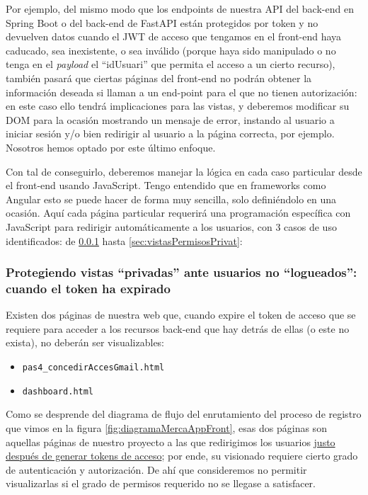 \documentclass[a4paper,12pt]{report}
\begin{document}
	Por ejemplo, del mismo modo que los endpoints de nuestra API del back-end en Spring Boot o del back-end de FastAPI están protegidos por token y no devuelven datos cuando el JWT de acceso que tengamos en el front-end haya caducado, sea inexistente, o sea inválido (porque haya sido manipulado o no tenga en el \textit{payload} el ``idUsuari'' que permita el acceso a un cierto recurso), también pasará que ciertas páginas del front-end no podrán obtener la información deseada si llaman a un end-point para el que no tienen autorización: en este caso ello tendrá implicaciones para las vistas, y deberemos modificar su DOM para la ocasión mostrando un mensaje de error, instando al usuario a iniciar sesión y/o bien redirigir al usuario a la página correcta, por ejemplo. Nosotros hemos optado por este último enfoque.
	
	Con tal de conseguirlo, deberemos manejar la lógica en cada caso particular desde el front-end usando JavaScript. Tengo entendido que en frameworks como Angular esto se puede hacer de forma muy sencilla, solo definiéndolo en una ocasión. Aquí cada página particular requerirá una programación específica con JavaScript para redirigir automáticamente a los usuarios, con 3 casos de uso identificados: de \ref{sec:privatsNologuejats} hasta \ref{sec:vistasPermisosPrivat}:
	
	\subsubsection{Protegiendo vistas ``privadas'' ante usuarios no ``logueados'': cuando el token ha expirado}
	\label{sec:privatsNologuejats}
	
	Existen dos páginas de nuestra web que, cuando expire el token de acceso que se requiere para acceder a los recursos back-end que hay detrás de ellas (o este no exista), no deberán ser visualizables:
	
	\vspace{0em}
	\begin{itemize}
		\setlength{\itemsep}{-.5em}
		\item \texttt{pas4\_concedirAccesGmail.html}
		\item \texttt{dashboard.html}
	\end{itemize}
	
	Como se desprende del diagrama de flujo del enrutamiento del proceso de registro que vimos en la figura \ref{fig:diagramaMercaAppFront}, esas dos páginas son aquellas páginas de nuestro proyecto a las que redirigimos los usuarios \underline{justo después de generar tokens de acceso}; por ende, su visionado requiere cierto grado de autenticación y autorización. De ahí que consideremos no permitir visualizarlas si el grado de permisos requerido no se llegase a satisfacer.
	
\end{document}

